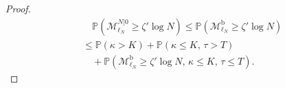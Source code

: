 \begin{proof}
{    }
    \begin{align}
        &\quad
        \mathbb P\left(
            \mathcal M^{N|0}_{\ell_N}
            \ge
            \zeta'\log N
        \right)
        \le
        \mathbb P\left(
            \mathcal M^{\mathrm b}_{\ell_N}
            \ge
            \zeta'\log N
        \right)
        \nonumber
        \\
        &
        \le
        \mathbb P\left(
            \kappa>K
        \right)
        +
        \mathbb P\left(
            \kappa\le K,\,
            \tau>T
        \right)
        \nonumber \\ &\quad
        +
        \mathbb P\left(
            \mathcal M^{\mathrm b}_{\ell_N}
            \ge
            \zeta'\log N,\,\kappa\le K,\, \tau\le T
        \right).
        \label{eq:a:0:1}
    \end{align}


\end{proof}
